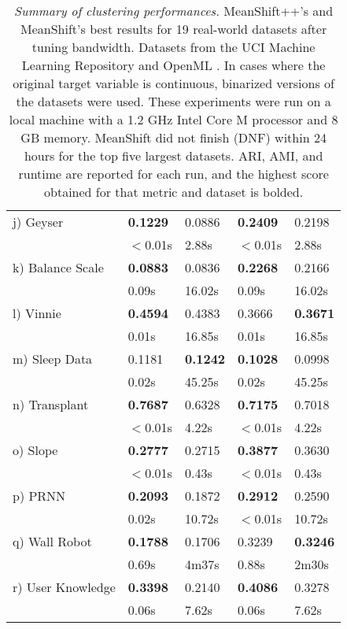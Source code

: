 \begin{table}
\begin{tabular}{ |p{2.2cm}||p{0.95cm}|p{1.0cm}||p{0.95cm}|p{1.0cm}| }
        j) Geyser & \textbf{0.1229} & 0.0886 & \textbf{0.2409} & 0.2198 \\
        & $<$0.01s & 2.88s & $<$0.01s & 2.88s \\
        \hline
        k) Balance Scale & \textbf{0.0883} & 0.0836 & \textbf{0.2268} & 0.2166 \\
        & 0.09s & 16.02s & 0.09s & 16.02s \\
        \hline
        l) Vinnie & \textbf{0.4594} & 0.4383 & 0.3666 & \textbf{0.3671} \\
        & 0.01s & 16.85s & 0.01s & 16.85s \\
        \hline
        m) Sleep Data & 0.1181 & \textbf{0.1242} & \textbf{0.1028} & 0.0998 \\
        & 0.02s & 45.25s & 0.02s & 45.25s \\
        \hline
        n) Transplant & \textbf{0.7687} & 0.6328 & \textbf{0.7175} & 0.7018 \\
        & $<$0.01s & 4.22s & $<$0.01s & 4.22s \\
        \hline
        o) Slope & \textbf{0.2777} & 0.2715 & \textbf{0.3877} & 0.3630 \\
        & $<$0.01s & 0.43s & $<$0.01s & 0.43s \\
        \hline
        p) PRNN & \textbf{0.2093} & 0.1872 & \textbf{0.2912} & 0.2590 \\
        & 0.02s & 10.72s & $<$0.01s & 10.72s \\
        \hline
        q) Wall Robot & \textbf{0.1788} & 0.1706 & 0.3239 & \textbf{0.3246} \\
        & 0.69s & 4m37s & 0.88s & 2m30s \\
        \hline
        r) User Knowledge & \textbf{0.3398} & 0.2140 & \textbf{0.4086} & 0.3278 \\
        & 0.06s & 7.62s & 0.06s & 7.62s \\
        \hline
    \end{tabular}
    \vspace{0.3cm}
    \caption{\label{fig:datasetsummary_large}\textit{Summary of clustering performances.} MeanShift++'s and MeanShift's best results for 19 real-world datasets after tuning bandwidth. Datasets from the UCI Machine Learning Repository \cite{Dua:2019} and OpenML \cite{OpenML2013}. In cases where the original target variable is continuous, binarized versions of the datasets were used. These experiments were run on a local machine with a 1.2 GHz Intel Core M processor and 8 GB memory. MeanShift did not finish (DNF) within 24 hours for the top five largest datasets. ARI, AMI, and runtime are reported for each run, and the highest score obtained for that metric and dataset is bolded.}
\end{table}

